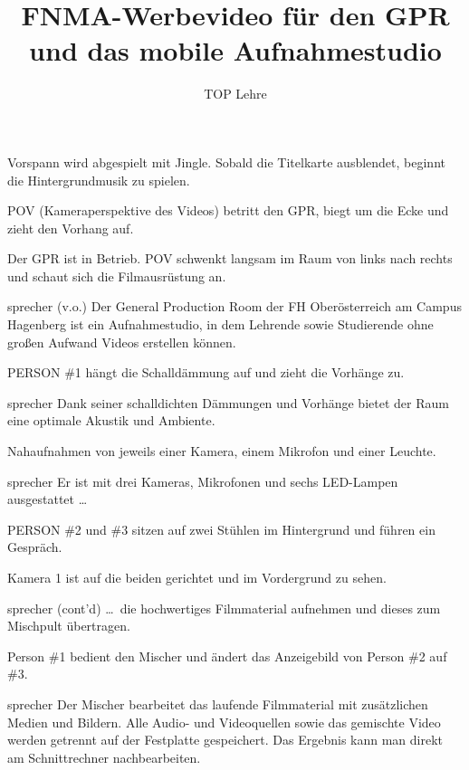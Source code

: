 \documentclass{screenplay}
\title{
	FNMA-Werbevideo für den GPR\\
	und das mobile Aufnahmestudio
}
\author{TOP Lehre}
\begin{document}
	\coverpage
	\fadein
	
	
	Vorspann wird abgespielt mit Jingle. Sobald die Titelkarte ausblendet, beginnt die Hintergrundmusik zu spielen.
	
	
	POV (Kameraperspektive des Videos) betritt den GPR, biegt um die Ecke und zieht den Vorhang auf.
	
	
	Der GPR ist in Betrieb. POV schwenkt langsam im Raum von links nach rechts und schaut sich die Filmausrüstung an.
	
	\begin{dialogue}[nüchtern]{sprecher (v.o.)}
		Der General Production Room der FH Oberösterreich am Campus Hagenberg ist ein Aufnahmestudio, in dem Lehrende sowie Studierende ohne großen Aufwand Videos erstellen können.
	\end{dialogue}
	
	PERSON \#1 hängt die Schalldämmung auf und zieht die Vorhänge zu.
	
	\begin{dialogue}{sprecher}
		Dank seiner schalldichten Dämmungen und Vorhänge bietet der Raum eine optimale Akustik und Ambiente.
	\end{dialogue}
	
	Nahaufnahmen von jeweils einer Kamera, einem Mikrofon und einer Leuchte.
	
	\begin{dialogue}{sprecher}
		Er ist mit drei Kameras, Mikrofonen und sechs LED-Lampen ausgestattet \dots
	\end{dialogue}
	
	PERSON \#2 und \#3 sitzen auf zwei Stühlen im Hintergrund und führen ein Gespräch.
	
	Kamera 1 ist auf die beiden gerichtet und im Vordergrund zu sehen.
	
	\begin{dialogue}{sprecher (cont'd)}
		\dots~die hochwertiges Filmmaterial aufnehmen und dieses zum Mischpult übertragen.
	\end{dialogue}
	
	Person \#1 bedient den Mischer und ändert das Anzeigebild von Person \#2 auf \#3.
	
	\begin{dialogue}{sprecher}
		Der Mischer bearbeitet das laufende Filmmaterial mit zusätzlichen Medien und Bildern. Alle Audio- und Videoquellen sowie das gemischte Video werden getrennt auf der Festplatte gespeichert. Das Ergebnis kann man direkt am Schnittrechner nachbearbeiten.
	\end{dialogue}
	
\end{document}
